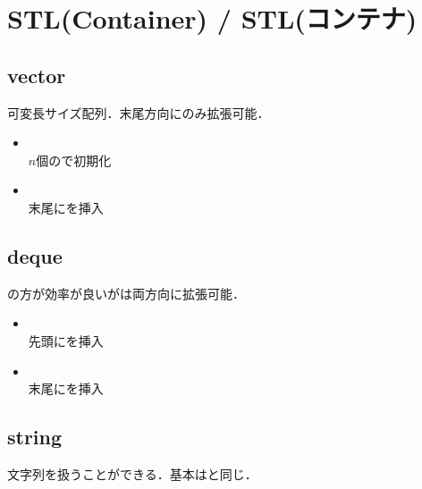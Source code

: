 \section{STL(Container) / STL(コンテナ)}

\subsection{vector}

可変長サイズ配列．末尾方向にのみ拡張可能．

\begin{itemize}
	\item {} \\
	$n$個ので初期化
	\item {} \\
	末尾にを挿入
\end{itemize}

\subsection{deque}

の方が効率が良いがは両方向に拡張可能．

\begin{itemize}
	\item {} \\
	先頭にを挿入
	\item {} \\
	末尾にを挿入
\end{itemize}

\subsection{string}

文字列を扱うことができる．基本はと同じ．



